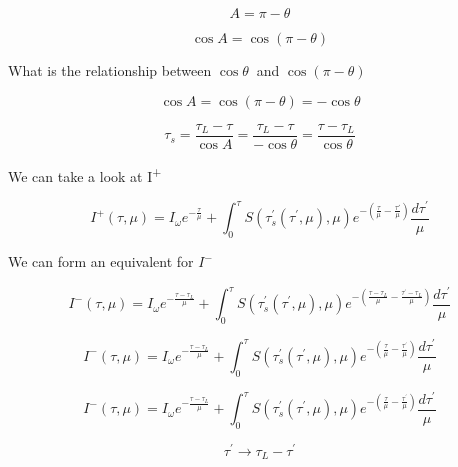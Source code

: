 \documentclass[12pt]{article}
\renewcommand{\_}{\kern-1.5pt\textunderscore\kern-1.5pt}
\begin{document}
 \[ A= \pi - \theta  \] \par

 \[ \cos A=\cos  \left(  \pi - \theta  \right)  \] \par

What is the relationship between  \( \cos  \theta ~ \)  and  \( \cos  \left(  \pi - \theta  \right)  \) \par

\par

 \[ \cos A=\cos  \left(  \pi - \theta  \right) =-\cos  \theta  \] \par

 \[  \tau_{s}=\frac{ \tau_{L}- \tau}{\cos A}=\frac{ \tau_{L}- \tau}{-\cos  \theta }=\frac{ \tau- \tau_{L}}{\cos  \theta } \] \par

We can take a look at I\textsuperscript{+}\par

 \[ I^{+} \left(  \tau, \mu  \right) =I_{ \omega }e^{-\frac{ \tau}{ \mu }}+ \int _{0}^{ \tau}S \left(  \tau_{s}^{'} \left(  \tau^{'}, \mu  \right) , \mu  \right) e^{- \left( \frac{ \tau}{ \mu }-\frac{ \tau'}{ \mu } \right) }\frac{d \tau^{'}}{ \mu } \] \par

We can form an equivalent for  \( I^{-} \) \par

 \[ I^{-} \left(  \tau, \mu  \right) =I_{ \omega }e^{-\frac{ \tau- \tau_{L}}{ \mu }}+ \int _{0}^{ \tau}S \left(  \tau_{s}^{'} \left(  \tau^{'}, \mu  \right) , \mu  \right) e^{- \left( \frac{ \tau- \tau_{L}}{ \mu }-\frac{ \tau^{'}- \tau_{L}}{ \mu } \right) }\frac{d \tau^{'}}{ \mu } \] \par

 \[ I^{-} \left(  \tau, \mu  \right) =I_{ \omega }e^{-\frac{ \tau- \tau_{L}}{ \mu }}+ \int _{0}^{ \tau}S \left(  \tau_{s}^{'} \left(  \tau^{'}, \mu  \right) , \mu  \right) e^{- \left( \frac{ \tau}{ \mu }-\frac{ \tau^{'}}{ \mu } \right) }\frac{d \tau^{'}}{ \mu } \] \par

 \[ I^{-} \left(  \tau, \mu  \right) =I_{ \omega }e^{-\frac{ \tau- \tau_{L}}{ \mu }}+ \int _{0}^{ \tau}S \left(  \tau_{s}^{'} \left(  \tau^{'}, \mu  \right) , \mu  \right) e^{- \left( \frac{ \tau}{ \mu }-\frac{ \tau^{'}}{ \mu } \right) }\frac{d \tau^{'}}{ \mu } \] \par


\vspace{\baselineskip}
 \[  \tau^{'} \rightarrow   \tau_{L}- \tau^{'} \] \par
\end{document}
